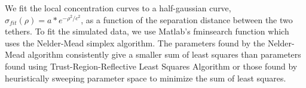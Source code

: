 \documentclass[../../AdvancementSummary.tex]{subfiles}
\begin{document}
We fit the local concentration curves to a half-gaussian curve, $\sigma_{fit}(\rho) = a*e^{-\rho^2/c^2}$, as a function of the separation distance between the two tethers. To fit the simulated data, we use Matlab's fminsearch function which uses the Nelder-Mead simplex algorithm.  The parameters found by the Nelder-Mead algorithm consistently give a smaller sum of least squares than parameters found using Trust-Region-Reflective Least Squares Algorithm or those found by heuristically sweeping parameter space to minimize the sum of least squares.


%
%
%
%
%
%
\end{document}
